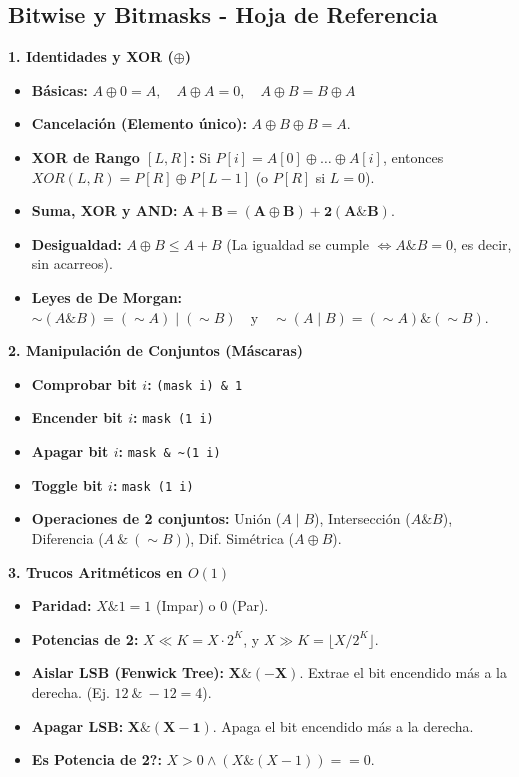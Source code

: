 \subsection{Bitwise y Bitmasks - Hoja de Referencia}

\textbf{1. Identidades y XOR ($\oplus$)}
\begin{itemize}
    \item \textbf{Básicas:} $A \oplus 0 = A, \quad A \oplus A = 0, \quad A \oplus B = B \oplus A$
    \item \textbf{Cancelación (Elemento único):} $A \oplus B \oplus B = A$.
    \item \textbf{XOR de Rango $[L, R]$:} Si $P[i] = A[0] \oplus \dots \oplus A[i]$, entonces $XOR(L,R) = P[R] \oplus P[L-1]$ (o $P[R]$ si $L=0$).
    \item \textbf{Suma, XOR y AND:} $\mathbf{A + B = (A \oplus B) + 2(A \& B)}$. 
    \item \textbf{Desigualdad:} $A \oplus B \le A + B$ (La igualdad se cumple $\iff A \& B = 0$, es decir, sin acarreos).
    \item \textbf{Leyes de De Morgan:} $\sim(A \& B) = (\sim A) \mid (\sim B) \quad \text{y} \quad \sim(A \mid B) = (\sim A) \& (\sim B)$.
\end{itemize}

\textbf{2. Manipulación de Conjuntos (Máscaras)}
\begin{itemize}
    \item \textbf{Comprobar bit $i$:} \texttt{(mask \gg i) \& 1}
    \item \textbf{Encender bit $i$:} \texttt{mask \mid (1 \ll i)}
    \item \textbf{Apagar bit $i$:} \texttt{mask \& \sim(1 \ll i)}
    \item \textbf{Toggle bit $i$:} \texttt{mask \oplus (1 \ll i)}
    \item \textbf{Operaciones de 2 conjuntos:} Unión ($A \mid B$), Intersección ($A \& B$), Diferencia ($A \ \& \ (\sim B)$), Dif. Simétrica ($A \oplus B$).
\end{itemize}

\textbf{3. Trucos Aritméticos en $O(1)$}
\begin{itemize}
    \item \textbf{Paridad:} $X \& 1 = 1$ (Impar) o $0$ (Par).
    \item \textbf{Potencias de 2:} $X \ll K = X \cdot 2^K$, y $X \gg K = \lfloor X / 2^K \rfloor$.
    \item \textbf{Aislar LSB (Fenwick Tree):} $\mathbf{X \& (-X)}$. Extrae el bit encendido más a la derecha. (Ej. $12 \ \& \ -12 = 4$).
    \item \textbf{Apagar LSB:} $\mathbf{X \& (X-1)}$. Apaga el bit encendido más a la derecha.
    \item \textbf{Es Potencia de 2?:} $X > 0 \land (X \& (X-1)) == 0$.
\end{itemize}

